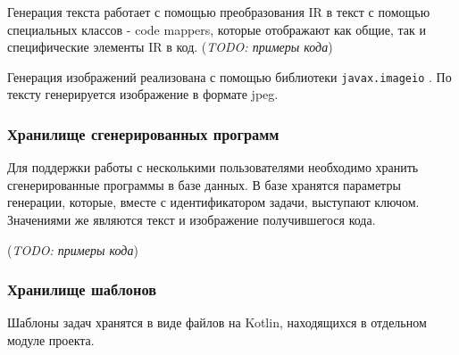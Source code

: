 Генерация текста работает с помощью преобразования IR в текст с помощью
специальных классов - code mappers, которые отображают как общие, так и
специфические элементы IR в код. (\textit{TODO: примеры кода})

Генерация изображений реализована с помощью библиотеки \texttt{javax.imageio}
\cite{imageio}. По тексту генерируется изображение в формате jpeg.

\subsubsection{Хранилище сгенерированных программ}
Для поддержки работы с несколькими пользователями необходимо хранить сгенерированные
программы в базе данных. В базе хранятся параметры генерации, которые, вместе с
идентификатором задачи, выступают ключом. Значениями же являются текст и изображение
получившегося кода.

(\textit{TODO: примеры кода})

\subsubsection{Хранилище шаблонов}
Шаблоны задач хранятся в виде файлов на Kotlin, находящихся в отдельном модуле
проекта.
